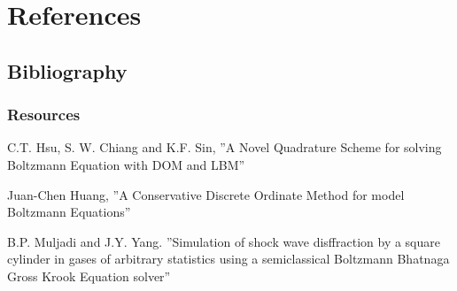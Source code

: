 \section{References}
\subsection{Bibliography}

\begin{frame}
	\frametitle{Resources}
	 \begin{thebibliography}{10}

  	\beamertemplatearticlebibitems

    	C.T. Hsu, S. W. Chiang and K.F. Sin, ''A Novel Quadrature Scheme for solving Boltzmann Equation with DOM and LBM''

    	Juan-Chen Huang, ''A Conservative Discrete Ordinate Method for model Boltzmann Equations''

	B.P. Muljadi and J.Y. Yang. ''Simulation of shock wave disffraction by a square cylinder in gases of arbitrary statistics using a semiclassical Boltzmann Bhatnaga Gross Krook Equation solver''
  \end{thebibliography}
\end{frame}